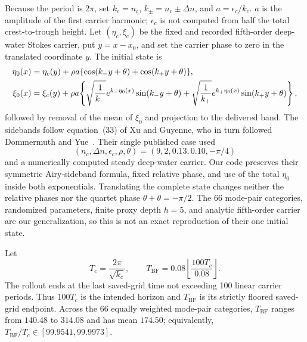\documentclass[10pt]{article}
\begin{document}
Because the period is $2\pi$, set
$k_c=n_c$, $k_\pm=n_c\pm\Delta n$, and $a=\epsilon_c/k_c$.
$a$ is the amplitude of the first carrier harmonic; $\epsilon_c$ is not
computed from half the total crest-to-trough height.
Let $(\eta_c,\xi_c)$ be the fixed and recorded fifth-order deep-water Stokes
carrier, put $y=x-x_0$, and set the carrier phase to zero in the translated
coordinate $y$.
The initial state is
\begin{align}
  \eta_0(x)
    &=
    \eta_c(y)
    +\rho a\{\cos(k_-y+\theta)+\cos(k_+y+\theta)\}, \notag\\
  \xi_0(x)
    &=
    \xi_c(y)
    +\rho a\!\left\{
      \sqrt{\frac1{k_-}}e^{k_-\eta_0(x)}\sin(k_-y+\theta)
      +
      \sqrt{\frac1{k_+}}e^{k_+\eta_0(x)}\sin(k_+y+\theta)
    \right\},
  \label{eq:bf-state}
\end{align}
followed by removal of the mean of $\xi_0$ and projection to the delivered
band.  The sidebands follow equation~(33) of Xu and Guyenne, who in turn
followed Dommermuth and Yue~\cite{xu2009,dommermuth1987}.  Their single
published case used
\[
  (n_c,\Delta n,\epsilon_c,\rho,\theta)
  =(9,2,0.13,0.10,-\pi/4)
\]
and a numerically computed steady deep-water carrier.  Our code preserves
their symmetric Airy-sideband formula, fixed relative phase, and use of the
total $\eta_0$ inside both exponentials.  Translating the complete state
changes neither the relative phases nor the quartet phase
$\theta+\theta=-\pi/2$.  The 66 mode-pair categories, randomized parameters,
finite proxy depth $h=5$, and analytic fifth-order carrier are our
generalization, so this is not an exact reproduction of their one initial
state.

Let
\[
  T_c=\frac{2\pi}{\sqrt{k_c}},\qquad
  T_{\mathrm{BF}}
  =0.08\left\lfloor\frac{100T_c}{0.08}\right\rfloor.
\]
The rollout ends at the last saved-grid time not exceeding 100 linear carrier
periods.  Thus $100T_c$ is the intended horizon and
$T_{\mathrm{BF}}$ is its strictly floored saved-grid endpoint.  Across the
66 equally weighted mode-pair categories, $T_{\mathrm{BF}}$ ranges from
$140.48$ to $314.08$ and has mean $174.50$; equivalently,
$T_{\mathrm{BF}}/T_c\in[99.9541,99.9973]$.
\end{document}

